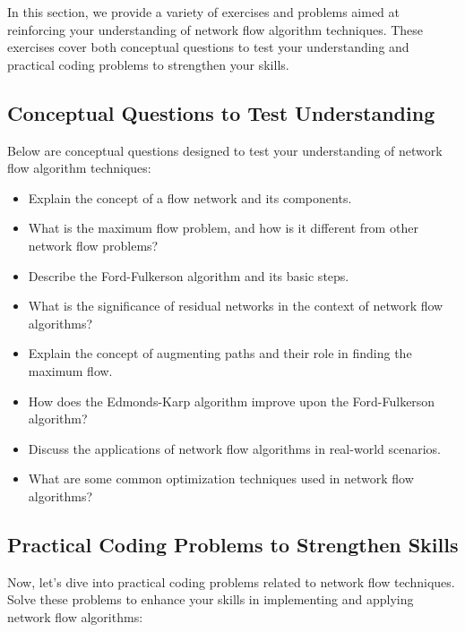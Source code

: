 \documentclass[12pt]{book} %
\begin{document}
In this section, we provide a variety of exercises and problems aimed at reinforcing your understanding of network flow algorithm techniques. These exercises cover both conceptual questions to test your understanding and practical coding problems to strengthen your skills. 

\subsection{Conceptual Questions to Test Understanding}

Below are conceptual questions designed to test your understanding of network flow algorithm techniques:

\begin{itemize}
    \item Explain the concept of a flow network and its components.
    \item What is the maximum flow problem, and how is it different from other network flow problems?
    \item Describe the Ford-Fulkerson algorithm and its basic steps.
    \item What is the significance of residual networks in the context of network flow algorithms?
    \item Explain the concept of augmenting paths and their role in finding the maximum flow.
    \item How does the Edmonds-Karp algorithm improve upon the Ford-Fulkerson algorithm?
    \item Discuss the applications of network flow algorithms in real-world scenarios.
    \item What are some common optimization techniques used in network flow algorithms?
\end{itemize}

\subsection{Practical Coding Problems to Strengthen Skills}

Now, let's dive into practical coding problems related to network flow techniques. Solve these problems to enhance your skills in implementing and applying network flow algorithms:
\end{document}

